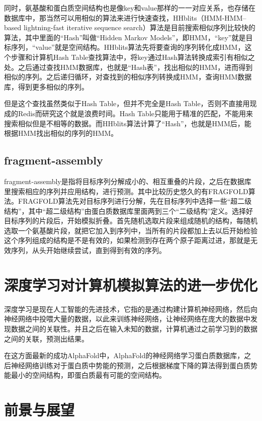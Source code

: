 \documentclass{article}
\begin{document}
同时，氨基酸和蛋白质空间结构也是像key和value那样的一一对应关系，也存储在数据库中，那当然可以用相似的算法来进行快速查找，HHblits（HMM-HMM–based lightning-fast iterative sequence
search）算法是目前搜索相似序列比较快的算法，其中里面的“Hash”叫做“Hidden  Markov Models”，即HMM，“key”就是目标序列，“value”就是空间结构。HHblits算法先将要查询的序列转化成HMM，这个步骤和计算机Hash Table查找算法中，将key通过Hash算法转换成索引有相似之处。之后通过查找HMM数据库，也就是“Hash表”，找出相似的HMM，进而得到相似的序列。之后递归循环，对查找到的相似序列转换成HMM，查询HMM数据库，得到更多相似的序列。

但是这个查找虽然类似于Hash Table，但并不完全是Hash Table，否则不直接用现成的Redis而研究这个就是浪费时间。Hash Table只能用于精准的匹配，不能用来搜索相似但是不相等的数据。而HHblits算法计算了“Hash”，也就是HMM后，能根据HMM找出相似的序列的HMM。

\subsection{fragment-assembly}

fragment-assembly是指将目标序列分解成小的、相互重叠的片段，之后在数据库里搜索相应的序列并应用结构，进行预测。其中比较历史悠久的有FRAGFOLD算法。FRAGFOLD算法先对目标序列进行分解，先在目标序列中选择一些“超二级结构”，其中“超二级结构”由蛋白质数据库里面两到三个“二级结构”定义。选择好目标序列的片段后，开始模拟折叠。首先随机选取片段来组成随机的结构，每随机选取一个氨基酸片段，就把它加入到序列中，当所有的片段都加上去以后开始检验这个序列组成的结构是不是有效的，如果检测到存在两个原子距离过进，那就是无效序列，从头开始继续尝试，直到得到有效的序列。

\section{深度学习对计算机模拟算法的进一步优化}

深度学习是现在人工智能的先进技术，它指的是通过构建计算机神经网络，然后向神经网络中投喂大量的数据，以此来训练神经网络，让神经网络在庞大的数据中发现数据之间的关联性。并且之后在输入未知的数据，计算机通过之前学习到的数据之间的关联，预测出结果。

在这方面最新的成功AlphaFold中，AlphaFold的神经网络学习蛋白质数据库，之后神经网络训练对于蛋白质中势能的预测，之后根据梯度下降的算法得到蛋白质势能最小的空间结构，即蛋白质最有可能的空间结构。

\section{前景与展望}
\end{document}
